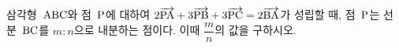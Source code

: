삼각형~$\pt{ABC}$와 점~$\pt{P}$에 대하여 $2\vecAB{PA}+3\vecAB{PB}+3\vecAB{PC}=2\vecAB{BA}$가 성립할 때, 점~$\pt{P}$는 선분~$\pt{BC}$를 $m:n$으로 내분하는 점이다. 이때 $\dfrac{m}{n}$의 값을 구하시오.
